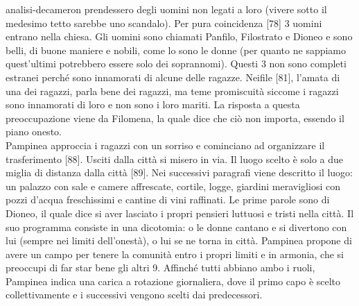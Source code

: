 \documentclass[preview]{standalone}
\begin{document}
\begin{snippet}{analisi-decameron}
    prendessero degli uomini non legati a loro (vivere sotto il medesimo tetto sarebbe uno scandalo).
    Per pura coincidenza [78] 3 uomini entrano nella chiesa. Gli uomini sono chiamati Panfilo, Filostrato e Dioneo
    e sono belli, di buone maniere e nobili, come lo sono le donne (per quanto ne sappiamo quest'ultimi potrebbero essere solo dei soprannomi).
    Questi 3 non sono completi estranei perché sono innamorati di alcune delle ragazze.
    Neifile [81], l'amata di una dei ragazzi, parla bene dei ragazzi, ma teme
    promiscuità siccome i ragazzi sono innamorati di loro e non sono i loro mariti.
    La risposta a questa preoccupazione viene da Filomena, la quale dice che ciò non importa,
    essendo il piano onesto. \\
    Pampinea approccia i ragazzi con un sorriso e cominciano ad organizzare il trasferimento [88].
    Usciti dalla città si misero in via. Il luogo scelto è solo a due miglia di distanza dalla città [89].
    Nei successivi paragrafi viene descritto il luogo: un palazzo con sale e camere affrescate, cortile, logge,
    giardini meravigliosi con pozzi d'acqua freschissimi e cantine di vini raffinati.
    Le prime parole sono di Dioneo, il quale dice si aver lasciato i propri pensieri luttuosi e tristi nella città.
    Il suo programma consiste in una dicotomia: o le donne cantano e si divertono con lui
    (sempre nei limiti dell'onestà), o lui se ne torna in città.
    Pampinea propone di avere un campo per tenere la comunità entro i propri limiti e in armonia,
    che si preoccupi di far star bene gli altri 9.
    Affinché tutti abbiano ambo i ruoli, Pampinea indica una carica a rotazione giornaliera,
    dove il primo capo è scelto collettivamente e i successivi vengono scelti dai predecessori.
\end{snippet}
\end{document}
